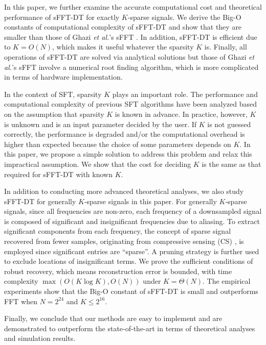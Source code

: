 \documentclass[journal,onecolumn,11pt]{IEEEtran}
\begin{document}
In this paper, we further examine the accurate computational cost and theoretical performance of sFFT-DT for exactly $K$-sparse signals.
We derive the Big-O constants of computational complexity of sFFT-DT and show that they are smaller than those of Ghazi {\em et al.}'s sFFT \cite{Ghazi2013}.
In addition, sFFT-DT is efficient due to $K=O(N)$, which makes it useful whatever the sparsity $K$ is.
Finally, all operations of sFFT-DT are solved via analytical solutions but those of Ghazi {\em et al.}'s sFFT involve a numerical root finding algorithm, which is more complicated in terms of hardware implementation.

In the context of SFT, sparsity $K$ plays an important role.
The performance and computational complexity of previous SFT algorithms \cite{Haitham2012}\cite{Haitham2012_1}\cite{Ghazi2013}\cite{Pawar2013} have been analyzed based on the assumption that sparsity $K$ is known in advance.
In practice, however, $K$ is unknown and is an input parameter decided by the user.
If $K$ is not guessed correctly, the performance is degraded and/or the computational overhead is higher than expected because the choice of some parameters depends on $K$.
In this paper, we propose a simple solution to address this problem and relax this impractical assumption.
We show that the cost for deciding $K$ is the same as that required for sFFT-DT with known $K$.

In addition to conducting more advanced theoretical analyses, we also study sFFT-DT for generally $K$-sparse signals in this paper.
For generally $K$-sparse signals, since all frequencies are non-zero, each frequency of a downsampled signal is composed of significant and insignificant frequencies due to aliasing.
To extract significant components from each frequency, the concept of sparse signal recovered from fewer samples, originating from compressive sensing (CS) \cite{Donoho2006}, is employed since significant entries are ``sparse''. A pruning strategy is further used to exclude locations of insignificant terms.
We prove the sufficient conditions of robust recovery, which means reconstruction error is bounded, with time complexity $\max(O(K\log K), O(N))$ under $K=\Theta(N)$.
The empirical experiments show that the Big-O constant of sFFT-DT is small and outperforms FFT when $N=2^{24}$ and $K\leq 2^{16}$.

Finally, we conclude that our methods are easy to implement and are demonstrated to outperform the state-of-the-art in terms of theoretical analyses and simulation results.
\end{document}
